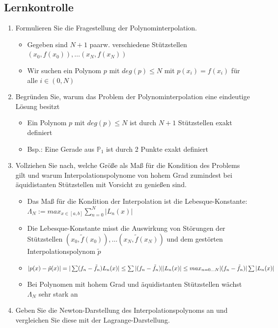 \documentclass[]{article}
\begin{document}
\subsection{Lernkontrolle}
	\begin{enumerate}
		\item Formulieren Sie die Fragestellung der Polynominterpolation.
			\begin{itemize}
				\item Gegeben sind $N+1$ paarw. verschiedene Stützstellen $(x_0, f(x_0)), \dots (x_N, f(x_N))$
				\item Wir suchen ein Polynom $p$ mit $deg(p) \leq N$ mit $p(x_i) = f(x_i)$ für alle $i \in (0, N)$
			\end{itemize}
		\item Begründen Sie, warum das Problem der Polynominterpolation eine eindeutige Lösung besitzt
			\begin{itemize}
				\item Ein Polynom $p$ mit $deg(p) \leq N$ ist durch $N+1$ Stützstellen exakt definiert
				\item Bsp.: Eine Gerade aus $\mathbb{P}_1$ ist durch 2 Punkte exakt definiert
			\end{itemize}	
		\item Vollziehen Sie nach, welche Größe als Maß für die Kondition des Problems gilt und warum Interpolationspolynome von hohem Grad zumindest bei äquidistanten Stützstellen mit Vorsicht zu genießen sind.
			\begin{itemize}
				\item Das Maß für die Kondition der Interpolation ist die Lebesque-Konstante: $\Lambda_N := max_{x \in [a,b]} \sum_{n=0}^N |L_n(x)|$
				\item Die Lebesque-Konstante misst die Auswirkung von Störungen der Stützstellen $(x_0, \tilde{f}(x_0)), \dots (x_N, \tilde{f}(x_N))$ und dem gestörten Interpolationspolynom $\tilde{p}$
				\item $|p(x) - \tilde{p}(x)| = |\sum (f_n - \tilde{f}_n) L_n(x)| \\
					\leq \sum |(f_n - \tilde{f}_n)| |L_n(x)| \\
					\leq max_{n=0 \dots N} |(f_n - \tilde{f}_n)| \sum |L_n(x)|$
				\item Bei Polynomen mit hohem Grad und äquidistanten Stützstellen wächst $\Lambda_N$ sehr stark an	 
			\end{itemize}
		\item Geben Sie die Newton-Darstellung des Interpolationspolynoms an und vergleichen Sie diese mit der Lagrange-Darstellung.

\end{enumerate}
\end{document}

